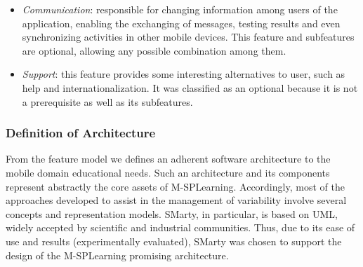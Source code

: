 \begin{itemize}
    \item \textit{Communication}: responsible for changing information among users of the application, enabling the exchanging of messages, testing results and even synchronizing activities in other mobile devices. This feature and subfeatures are optional, allowing any possible combination among them.
    
    \item \textit{Support}: this feature provides some interesting alternatives to user, such as help and internationalization. It was classified as an optional because it is not a prerequisite as well as its subfeatures.
\end{itemize}

\subsubsection{Definition of Architecture}

From the feature model we defines an adherent software architecture to the mobile domain educational needs. Such an architecture and its components represent abstractly the core assets of M-SPLearning. Accordingly, most of the approaches developed to assist in the management of variability involve several concepts and representation models. SMarty, in particular, is based on UML, widely accepted by scientific and industrial communities. Thus, due to its ease of use and results (experimentally evaluated), SMarty was chosen to support the design of the M-SPLearning promising architecture.

